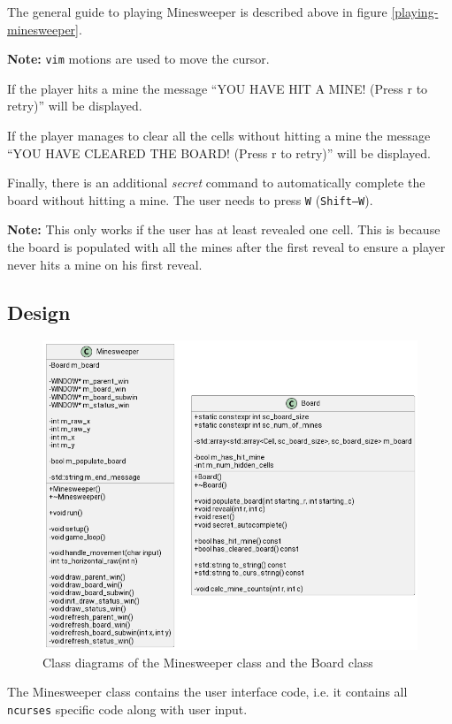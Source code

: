 \documentclass[12pt]{article}
\begin{document}
The general guide to playing Minesweeper is described above in
figure \ref{playing-minesweeper}.

\textbf{Note:} \texttt{vim} motions are used to move the cursor.

If the player hits a mine the message ``YOU HAVE HIT A MINE!
(Press r to retry)'' will be displayed. 

If the player manages to clear all the cells without hitting a
mine the message ``YOU HAVE CLEARED THE BOARD! (Press r to
retry)'' will be displayed.

Finally, there is an additional \textit{secret} command to
automatically complete the board without hitting a mine. The
user needs to press \texttt{W} (\texttt{Shift--W}).

\textbf{Note:} This only works if the user has at least revealed
one cell. This is because the board is populated with all the
mines after the first reveal to ensure a player never hits a
mine on his first reveal.

\subsection{Design}

\begin{figure}[H]
    \centering
    \includegraphics[width=12cm]{minesweeper-uml/minesweeper-and-board.png}
    \caption{Class diagrams of the Minesweeper class and the Board class}
\end{figure}

The Minesweeper class contains the user interface code, i.e. it
contains all \texttt{ncurses} specific code along with user
input.
\end{document}
